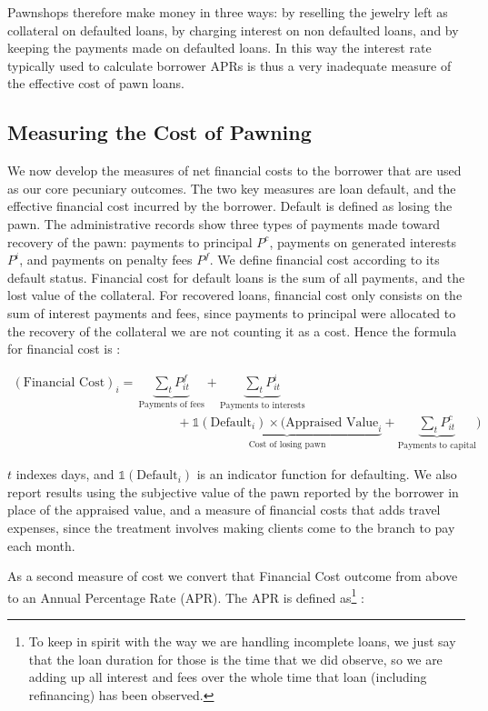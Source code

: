 \documentclass[oneside,11pt]{article}
\begin{document}
Pawnshops therefore make money in three ways: by reselling the jewelry left as collateral on defaulted loans, by charging interest on non defaulted loans, and by keeping the payments made on defaulted loans. In this way the interest rate typically used to calculate borrower APRs is thus a very inadequate measure of the effective cost of pawn loans.

    
\subsection{Measuring the Cost of Pawning} \label{costs}
    
We now develop the measures of net financial costs to the borrower that are used as our core pecuniary outcomes.  The two key measures are loan default, and the effective financial cost incurred by the borrower. Default is defined as losing the pawn. The administrative records show three types of payments made toward recovery of the pawn: payments to principal $P^c$, payments on generated interests $P^i$, and payments on penalty fees $P^f$. We define financial cost according to its default status. Financial cost for default loans is the sum of all payments, and the lost value of the collateral. For recovered loans, financial cost only consists on the sum of interest payments and fees, since payments to principal were allocated to the recovery of the collateral we are not counting it as a cost. Hence the formula for financial cost is :

\begin{align*}
    (\text{Financial Cost})_i =&  \underbrace{\sum_t P^f_{it}}_{\text{Payments of fees}}  +\underbrace{\sum_t P^i_{it}}_{\text{Payments to interests}} \\
    &\quad\qquad + \underbrace{\mathds{1}(\text{Default}_i) \times (\text{Appraised Value}_i}_{\text{Cost of losing pawn}} + \underbrace{\sum_t P^c_{it}}_{\text{Payments to capital}})
\end{align*}

\noindent $t$ indexes days, and $\mathds{1}(\text{Default}_i)$ is an indicator function for defaulting. We also report results using the subjective value of the pawn reported by the borrower in place of the appraised value, and a measure of financial costs that adds travel expenses, since the treatment involves making clients come to the branch to pay each month.

As a second measure of cost we convert that Financial Cost outcome from above to an Annual Percentage Rate (APR). The APR is defined as\footnote{To keep in spirit with the way we are handling incomplete loans, we just say that the loan duration for those is the time that we did observe, so we are adding up all interest and fees over the whole time that loan (including refinancing) has been observed.} :
\end{document}
